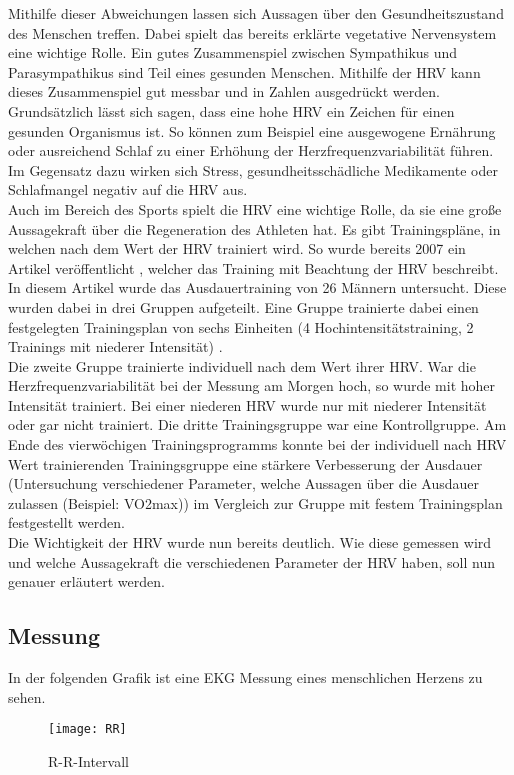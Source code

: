Mithilfe dieser Abweichungen lassen sich Aussagen über den Gesundheitszustand des Menschen treffen. Dabei spielt das bereits erklärte vegetative Nervensystem eine wichtige Rolle. Ein gutes Zusammenspiel zwischen Sympathikus und Parasympathikus sind Teil eines gesunden Menschen. Mithilfe der HRV kann dieses Zusammenspiel gut messbar und \glqq in Zahlen ausgedrückt werden\grqq{}. 
Grundsätzlich lässt sich sagen, dass eine hohe HRV ein Zeichen für einen gesunden Organismus ist. So können zum Beispiel eine ausgewogene Ernährung oder ausreichend Schlaf zu einer Erhöhung der Herzfrequenzvariabilität führen. Im Gegensatz dazu wirken sich Stress, gesundheitsschädliche Medikamente oder Schlafmangel negativ auf die HRV aus.\cite{hrv} \\
Auch im Bereich des Sports spielt die HRV eine wichtige Rolle, da sie eine große Aussagekraft über die Regeneration des Athleten hat. Es gibt Trainingspläne, in welchen nach dem Wert der HRV trainiert wird. So wurde bereits 2007 ein Artikel veröffentlicht \cite{sport}, welcher das Training mit Beachtung der HRV beschreibt. In diesem Artikel wurde das Ausdauertraining von 26 Männern untersucht. Diese wurden dabei in drei Gruppen aufgeteilt. Eine Gruppe trainierte dabei einen festgelegten Trainingsplan von sechs Einheiten (4 Hochintensitätstraining, 2 Trainings mit niederer Intensität) .\\
Die zweite Gruppe trainierte individuell nach dem Wert ihrer HRV. War die Herzfrequenzvariabilität bei der Messung am Morgen hoch, so wurde mit hoher Intensität trainiert. Bei einer niederen HRV wurde nur mit niederer Intensität oder gar nicht trainiert. Die dritte Trainingsgruppe war eine Kontrollgruppe. 
Am Ende des vierwöchigen Trainingsprogramms konnte bei der individuell nach HRV Wert trainierenden Trainingsgruppe eine stärkere Verbesserung der Ausdauer (Untersuchung verschiedener Parameter, welche Aussagen über die Ausdauer zulassen (Beispiel: VO2max)) im Vergleich zur Gruppe mit festem Trainingsplan festgestellt werden.\cite{sport}\\

Die Wichtigkeit der HRV wurde nun bereits deutlich. Wie diese gemessen wird und welche Aussagekraft die verschiedenen Parameter der HRV haben, soll nun genauer erläutert werden.

\subsection{Messung}
In der folgenden Grafik ist eine EKG Messung eines menschlichen Herzens zu sehen.
\begin{figure}[H]
    \centering
    \texttt{[image: RR]}
    \caption{R-R-Intervall}
    \label{fig:R-R-Intervall}
    \cite{rrbild}
\end{figure}

